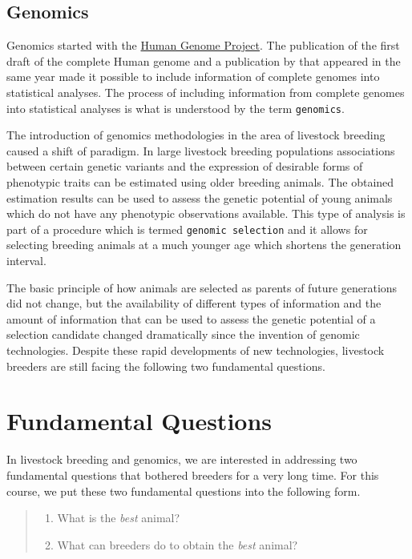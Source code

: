 \documentclass[
]{book}
\providecommand{\tightlist}{%
  \setlength{\itemsep}{0pt}\setlength{\parskip}{0pt}}
\theoremstyle{definition}
\theoremstyle{definition}
\theoremstyle{definition}
\theoremstyle{remark}
\begin{document}
\hypertarget{genomics}{%
\subsection{Genomics}\label{genomics}}

Genomics started with the \href{https://en.wikipedia.org/wiki/Human_Genome_Project}{Human Genome Project}. The publication of the first draft of the complete Human genome \citep{Venter2001} and a publication by \citep{Meuwissen2001} that appeared in the same year made it possible to include information of complete genomes into statistical analyses. The process of including information from complete genomes into statistical analyses is what is understood by the term \texttt{genomics}.

The introduction of genomics methodologies in the area of livestock breeding caused a shift of paradigm. In large livestock breeding populations associations between certain genetic variants and the expression of desirable forms of phenotypic traits can be estimated using older breeding animals. The obtained estimation results can be used to assess the genetic potential of young animals which do not have any phenotypic observations available. This type of analysis is part of a procedure which is termed \texttt{genomic\ selection} and it allows for selecting breeding animals at a much younger age which shortens the generation interval.

The basic principle of how animals are selected as parents of future generations did not change, but the availability of different types of information and the amount of information that can be used to assess the genetic potential of a selection candidate changed dramatically since the invention of genomic technologies. Despite these rapid developments of new technologies, livestock breeders are still facing the following two fundamental questions.

\hypertarget{fundamental-questions}{%
\section{Fundamental Questions}\label{fundamental-questions}}

In livestock breeding and genomics, we are interested in addressing two fundamental questions that bothered breeders for a very long time. For this course, we put these two fundamental questions into the following form.

\begin{quote}
\begin{enumerate}
\def\labelenumi{\arabic{enumi}.}
\tightlist
\item
  What is the \emph{best} animal?
\item
  What can breeders do to obtain the \emph{best} animal?
\end{enumerate}
\end{quote}
\end{document}
